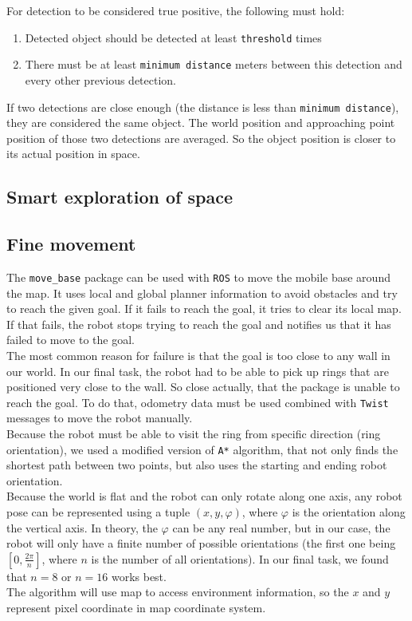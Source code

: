 \documentclass[12pt,a4paper]{article}
\begin{document}
	For detection to be considered true positive, the following must hold:
	\begin{enumerate}
		\item Detected object should be detected at least \texttt{threshold} times
		\item There must be at least \texttt{minimum distance} meters between this detection and every other previous detection.
	\end{enumerate}

	If two detections are close enough (the distance is less than \texttt{minimum distance}), they are considered the same object. The world position and approaching point position of those two detections are averaged. So the object position is closer to its actual position in space.
	
	\subsection{Smart exploration of space}
	\pagebreak
	
	\subsection{Fine movement}
	The \texttt{move\_base} package can be used with \texttt{ROS} to move the mobile base around the map. It uses local and global planner information to avoid obstacles and try to reach the given goal. If it fails to reach the goal, it tries to clear its local map. If that fails, the robot stops trying to reach the goal and notifies us that it has failed to move to the goal. \\
	
	The most common reason for failure is that the goal is too close to any wall in our world. In our final task, the robot had to be able to pick up rings that are positioned very close to the wall. So close actually, that the package is unable to reach the goal. To do that, odometry data must be used combined with \texttt{Twist} messages to move the robot manually. \\
	
	Because the robot must be able to visit the ring from specific direction (ring orientation), we used a modified version of \texttt{A*} algorithm, that not only finds the shortest path between two points, but also uses the starting and ending robot orientation. \\
	
	Because the world is flat and the robot can only rotate along one axis, any robot pose can be represented using a tuple $(x, y, \varphi)$, where $\varphi$ is the orientation along the vertical axis. In theory, the $\varphi$ can be any real number, but in our case, the robot will only have a finite number of possible orientations (the first one being $[0, \frac{2\pi}{n}]$, where $n$ is the number of all orientations). In our final task, we found that $n = 8$ or $n = 16$ works best. \\
	The algorithm will use map to access environment information, so the $x$ and $y$ represent pixel coordinate in map coordinate system.
	
\end{document}
